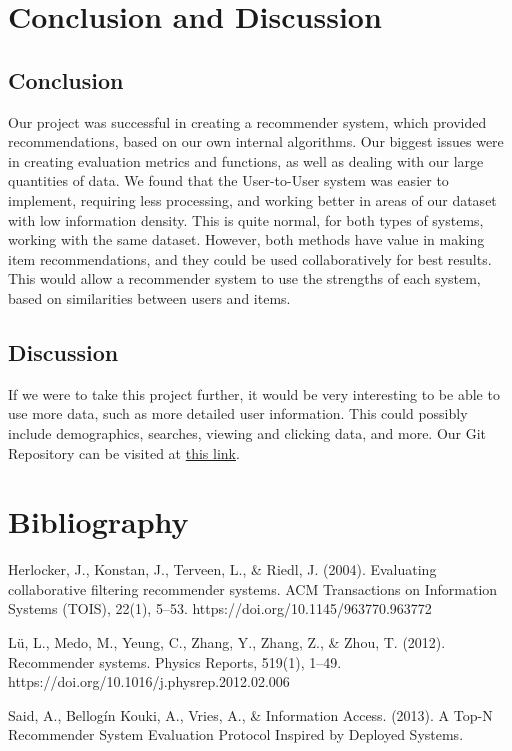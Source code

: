 \documentclass[11pt]{article}
\begin{document}
\section{Conclusion and Discussion}
\subsection{Conclusion}
Our project was successful in creating a recommender system, which provided recommendations, based on our own internal algorithms. Our biggest issues were in creating evaluation metrics and functions, as well as dealing with our large quantities of data. We found that the User-to-User system was easier to implement, requiring less processing, and working better in areas of our dataset with low information density. This is quite normal, for both types of systems, working with the same dataset. However, both methods have value in making item recommendations, and they could be used collaboratively for best results. This would allow a recommender system to use the strengths of each system, based on similarities between users and items. 

\subsection{Discussion}
If we were to take this project further, it would be very interesting to be able to use more data, such as more detailed user information. This could possibly include demographics, searches, viewing and clicking data, and more.
Our Git Repository can be visited at \href{https://github.com/Kamiel-Fokkink/Recommender_Systems_Kamiel_Baran_Sergio_Tomas}{this link}.
 

\section{Bibliography}
Herlocker, J., Konstan, J., Terveen, L., \& Riedl, J. (2004). Evaluating collaborative filtering recommender systems. ACM Transactions on Information Systems (TOIS), 22(1), 5–53. https://doi.org/10.1145/963770.963772

Lü, L., Medo, M., Yeung, C., Zhang, Y., Zhang, Z., \& Zhou, T. (2012). Recommender systems. Physics Reports, 519(1), 1–49. https://doi.org/10.1016/j.physrep.2012.02.006

Said, A., Bellogín Kouki, A., Vries, A., \& Information Access. (2013). A Top-N Recommender System Evaluation Protocol Inspired by Deployed Systems.
\end{document}
